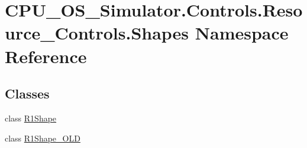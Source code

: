 \hypertarget{namespace_c_p_u___o_s___simulator_1_1_controls_1_1_resource___controls_1_1_shapes}{}\section{C\+P\+U\+\_\+\+O\+S\+\_\+\+Simulator.\+Controls.\+Resource\+\_\+\+Controls.\+Shapes Namespace Reference}
\label{namespace_c_p_u___o_s___simulator_1_1_controls_1_1_resource___controls_1_1_shapes}
\subsection*{Classes}
\begin{DoxyCompactItemize}
\item 
class \hyperlink{class_c_p_u___o_s___simulator_1_1_controls_1_1_resource___controls_1_1_shapes_1_1_r1_shape}{R1\+Shape}
\item 
class \hyperlink{class_c_p_u___o_s___simulator_1_1_controls_1_1_resource___controls_1_1_shapes_1_1_r1_shape___o_l_d}{R1\+Shape\+\_\+\+O\+L\+D}
\end{DoxyCompactItemize}
